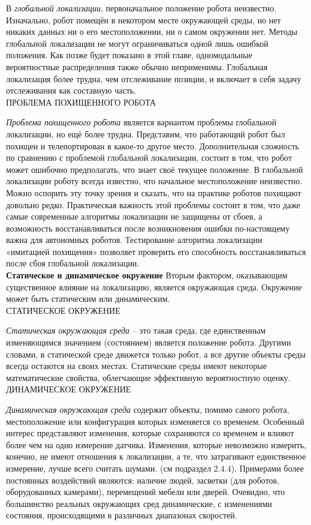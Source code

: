 \documentclass[10pt,a4paper]{article}
\begin{document}
В \textit{глобальной локализации}, первоначальное положение робота неизвестно. Изначально, робот  помещён в некотором месте окружающей среды, но нет никаких данных ни о его местоположении, ни о самом окружении нет. Методы глобальной локализации не могут ограничиваться одной лишь ошибкой положения. Как позже будет показано в этой главе, одномодальные вероятностные распределения также обычно неприменимы. Глобальная локализация более трудна, чем отслеживание позиции, и включает в себя задачу отслеживания как составную часть.\\ 
ПРОБЛЕМА ПОХИЩЕННОГО РОБОТА

\textit{Проблема похищенного робота} является вариантом проблемы глобальной локализации, но ещё более трудна. Представим, что работающий робот был похищен и телепортирован в какое-то другое место. Дополнительная сложность по сравнению с проблемой глобальной локализации, состоит в том, что робот может ошибочно предполагать, что знает своё текущее положение. В глобальной локализации роботу всегда известно, что начальное местоположение неизвестно. Можно оспорить эту точку зрения и сказать, что на практике роботов похищают довольно редко. Практическая важность этой проблемы состоит в том, что даже самые современные алгоритмы локализации не защищены от сбоев, а возможность восстанавливаться после возникновения ошибки по-настоящему важна для автономных роботов. Тестирование алгоритма локализации «имитацией похищения» позволяет проверить его способность восстанавливаться после сбоя глобальной локализации. \\

\textbf{Статическое и динамическое окружение} Вторым фактором, оказывающим существенное влияние на локализацию, является окружающая среда. Окружение может быть статическим или динамическим.\\
СТАТИЧЕСКОЕ ОКРУЖЕНИЕ 

\textit{Статическая окружающая среда} – это такая среда, где единственным изменяющимся значением (состоянием) является положение робота. Другими словами, в статической среде движется только робот, а все другие объекты среды всегда остаются на своих местах. Статические среды имеют некоторые математические свойства, облегчающие эффективную вероятностную оценку.\\ 
ДИНАМИЧЕСКОЕ ОКРУЖЕНИЕ

\textit{Динамическая окружающая среда} содержит объекты, помимо самого робота, местоположение или конфигурация которых изменяется со временем. Особенный интерес представляют изменения, которые сохраняются со временем и влияют более чем на одно измерение датчика. 
Изменения, которые невозможно измерить, конечно, не имеют отношения к локализации, а те, что затрагивают единственное измерение, лучше всего считать шумами. (см подраздел 2.4.4). Примерами более постоянных воздействий являются: наличие людей, засветки (для роботов, оборудованных камерами), перемещений мебели или дверей. Очевидно, что большинство реальных окружающих сред динамические, с изменениями состояния, происходящими в различных диапазонах скоростей. 
\end{document}

